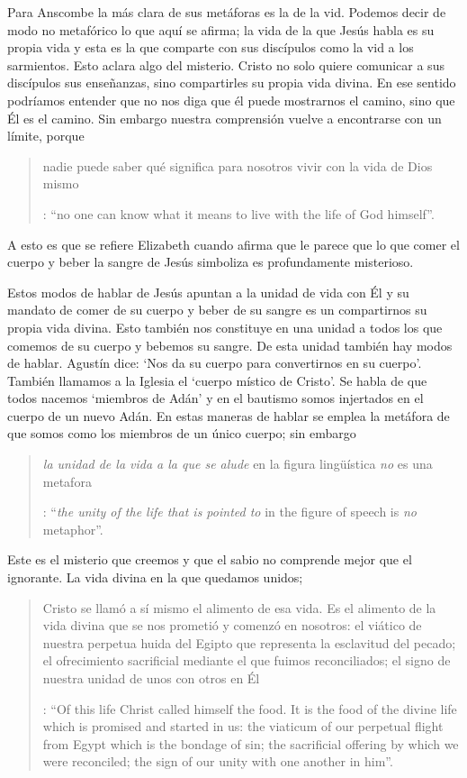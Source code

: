 Para Anscombe la más clara de sus metáforas es la de la vid. Podemos decir de modo no metafórico lo que aquí se afirma; la vida de la que Jesús habla es su propia vida y esta es la que comparte con sus discípulos como la vid a los sarmientos. Esto aclara algo del misterio. Cristo no solo quiere comunicar a sus discípulos sus enseñanzas, sino compartirles su propia vida divina. En ese sentido podríamos entender que no nos diga que él puede mostrarnos el camino, sino que Él es el camino. Sin embargo nuestra comprensión vuelve a encontrarse con un límite, porque \blockquote[
{\Cite[110]{anscombe1981erp:ot}}: \enquote{no one can know what it means to live with the life of God himself}.
]{nadie puede saber qué significa para nosotros vivir con la vida de Dios mismo}. A esto es que se refiere Elizabeth cuando afirma que le parece que lo que comer el cuerpo y beber la sangre de Jesús simboliza es profundamente misterioso.

Estos modos de hablar de Jesús apuntan a la unidad de vida con Él y su mandato de comer de su cuerpo y beber de su sangre es un compartirnos su propia vida divina. Esto también nos constituye en una unidad a todos los que comemos de su cuerpo y bebemos su sangre. De esta unidad también hay modos de hablar. Agustín dice: \enquote*{Nos da su cuerpo para convertirnos en su cuerpo}. También llamamos a la Iglesia el \enquote*{cuerpo místico de Cristo}. Se habla de que todos nacemos \enquote*{miembros de Adán} y en el bautismo somos injertados en el cuerpo de un nuevo Adán. En estas maneras de hablar se emplea la metáfora de que somos como los miembros de un único cuerpo; sin embargo \blockquote[
{\Cite[112]{anscombe1981erp:ot}}: \enquote{\emph{the unity of the life that is pointed to} in the figure of speech is \emph{no} metaphor}.
]{\emph{la unidad de la vida a la que se alude} en la figura lingüística \emph{no} es una metafora}.

Este es el misterio que creemos y que el sabio no comprende mejor que el ignorante. La vida divina en la que quedamos unidos; \blockquote[
{\Cite[112]{anscombe1981erp:ot}}: \enquote{Of this life Christ called himself the food. It is the food of the divine life which is promised and started in us: the viaticum of our perpetual flight from Egypt which is the bondage of sin; the sacrificial offering by which we were reconciled; the sign of our unity with one another in him}.
]{Cristo se llamó a sí mismo el alimento de esa vida. Es el alimento de la vida divina que se nos prometió y comenzó en nosotros: el viático de nuestra perpetua huida del Egipto que representa la esclavitud del pecado; el ofrecimiento sacrificial mediante el que fuimos reconciliados; el signo de nuestra unidad de unos con otros en Él}.

